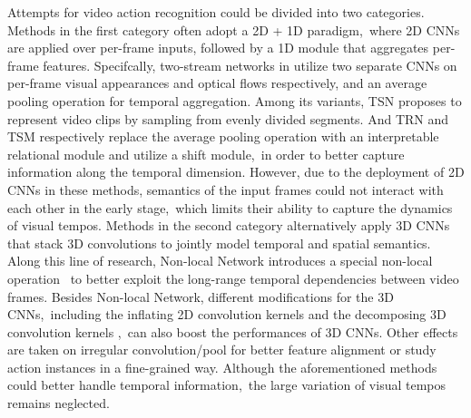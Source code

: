 \documentclass[10pt,twocolumn,letterpaper]{article}
\begin{document}
Attempts for video action recognition could be divided into two categories.
Methods in the first category often adopt a 2D + 1D paradigm,\
where 2D CNNs are applied over per-frame inputs, followed by a 1D module that aggregates per-frame features.
Specifcally, two-stream networks in \cite{twostream,tsfusion,cts,cnnforar} utilize two separate CNNs on per-frame visual appearances and optical flows respectively,
and an average pooling operation for temporal aggregation.
Among its variants, TSN \cite{tsn} proposes to represent video clips by sampling from evenly divided segments.
And TRN \cite{trn} and TSM \cite{tsm} respectively replace the average pooling operation with an interpretable relational module and utilize a shift module,\
in order to better capture information along the temporal dimension.
However, due to the deployment of 2D CNNs in these methods, semantics of the input frames could not interact with each other in the early stage,\
which limits their ability to capture the dynamics of visual tempos.
Methods \cite{c3d,3dforar} in the second category alternatively apply 3D CNNs that stack 3D convolutions to jointly model temporal and spatial semantics.
Along this line of research, Non-local Network \cite{nonlocal} introduces a special non-local operation \
to better exploit the long-range temporal dependencies between video frames.
Besides Non-local Network, different modifications for the 3D CNNs,\
including the inflating 2D convolution kernels \cite{kinetics} and the decomposing 3D convolution kernels \cite{p3d, r21d, r21d_v2},\
can also boost the performances of 3D CNNs.
Other effects \cite{trajpool,trajconv,improvedtraj,shao2020finegym,shao2020tapos} are taken on irregular convolution/pool for better feature alignment or study action instances in a fine-grained way. 
Although the aforementioned methods could better handle temporal information,\
the large variation of visual tempos remains neglected.
\end{document}
